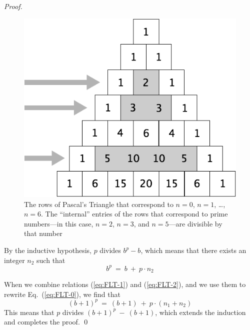 \begin{proof}
\begin{figure}[ht]
\begin{center}
  \includegraphics[scale=0.3]{FiguresArithmetic/TrianglePascalPrimes.png}
\caption{The rows of Pascal's Triangle that correspond to $n=0$, $n=1$, \ldots, $n=6$.  The ``internal'' entries of the rows that correspond to prime numbers---in this case, $n=2$, $n=3$, and $n=5$---are divisible by that number}
\label{fig:TrianglePrime}
\end{center}
\end{figure}

By the inductive hypothesis, $p$ divides $b^p -b$, which means that there exists an integer $n_2$ such that
\begin{equation}
\label{eq:FLT-2}
 b^p \ = \ b \ + \ p \cdot n_2
\end{equation}

\smallskip

When we combine relations (\ref{eq:FLT-1}) and (\ref{eq:FLT-2}), and we use them to rewrite Eq.~(\ref{eq:FLT-0}), we find that
\[
(b+1)^p \ = \ (b + 1) \ + \ p \cdot (n_1 + n_2)
\]
This means that $p$ divides $(b+1)^p \ - \ (b + 1)$, which extends the induction and completes the proof.  \qed
\end{proof}

